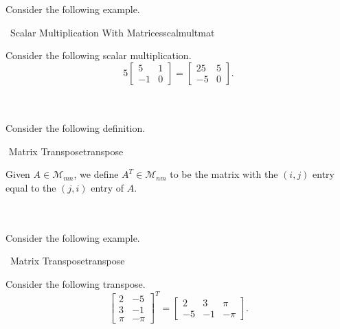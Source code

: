         \vphantom
        \\
        \\
        Consider the following example.
        \begin{example}{\Difficulty\,\Difficulty\,\,Scalar Multiplication With Matrices}{scalmultmat}
        
            Consider the following scalar multiplication.
            \begin{equation*}
                5\begin{bmatrix} 5 & 1 \\ -1 & 0 \end{bmatrix}=\begin{bmatrix} 25 & 5 \\ -5 & 0 \end{bmatrix}.
            \end{equation*}
        
        \end{example}
        \pagebreak
        \vphantom
        \\
        \\
        Consider the following definition.
        \begin{definition}{\Stop\,\,Matrix Transpose}{transpose}
        
            Given \(A\in\mathcal{M}_{mn}\), we define \(A^T\in\mathcal{M}_{nm}\) to be the matrix with the \((i,j)\) entry equal to the \((j,i)\) entry of \(A\).
        
        \end{definition}
        \vphantom
        \\
        \\
        Consider the following example.
        \begin{example}{\Difficulty\,\Difficulty\,\,Matrix Transpose}{transpose}
        
            Consider the following transpose.
            \begin{equation*}
                \begin{bmatrix} 2 & -5 \\ 3 & -1 \\ \pi & -\pi \end{bmatrix}^T=\begin{bmatrix} 2 & 3 & \pi \\ -5 & -1 & -\pi \end{bmatrix}.
            \end{equation*}
        
        \end{example}
